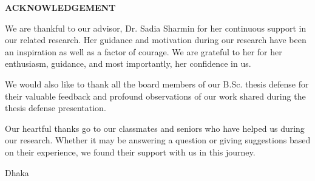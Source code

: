 \begin{center}
  \textbf{{\Large ACKNOWLEDGEMENT}}\\[60pt]
\end{center}

We are thankful to our advisor, Dr. Sadia Sharmin for her continuous support in our related research. Her guidance and motivation during our research have been an inspiration as well as a factor of courage. We are grateful to her for her enthusiasm, guidance, and most importantly, her confidence in us.

We would also like to thank all the board members of our B.Sc. thesis defense for their valuable feedback and profound observations of our work shared during the thesis defense presentation.

Our heartful thanks go to our classmates and seniors who have helped us during our research. Whether it may be answering a question or giving suggestions based on their experience, we found their support with us in this journey.

\vspace*{20.0mm}

\begin{minipage}[t]{0.2\textwidth}
  Dhaka\par
  \thesisdate
\end{minipage}%
\hfill
\begin{minipage}[t]{0.45\textwidth}
  \begin{enumerate}
    \vspace{-0.75\baselineskip}
  \end{enumerate}
\end{minipage}

\endinput

